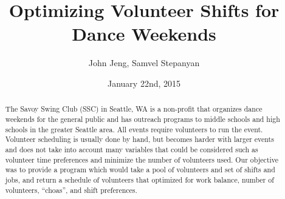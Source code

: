 \documentclass[11pt]{article}
\title{Optimizing Volunteer Shifts for Dance Weekends}
\author{John Jeng, Samvel Stepanyan}
\date{January 22nd, 2015}
\theoremstyle{definition}
\begin{document}
\maketitle
\begin{abstract}
	The Savoy Swing Club (SSC) in Seattle, WA is a non-profit that organizes dance weekends for the general public and has outreach programs to middle schools and high schools in the greater Seattle area. All events require volunteers to run the event. Volunteer scheduling is usually done by hand, but becomes harder with larger events and does not take into account many variables that could be considered such as volunteer time preferences and minimize the number of volunteers used. Our objective was to provide a program which would take a pool of volunteers and set of shifts and jobs, and return a schedule of volunteers that optimized for work balance, number of volunteers, ``choas'', and shift preferences.
\end{abstract}
\noindent\makebox[\linewidth]{\rule{\textwidth}{0.4pt}}
\end{document}
